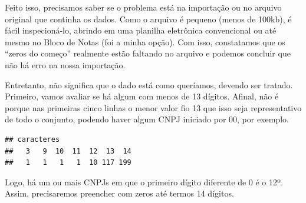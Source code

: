 \documentclass[
]{book}
\newenvironment{Shaded}{\begin{snugshade}}{\end{snugshade}}
\newcommand{\CommentTok}[1]{\textcolor[rgb]{0.56,0.35,0.01}{\textit{#1}}}
\newcommand{\ControlFlowTok}[1]{\textcolor[rgb]{0.13,0.29,0.53}{\textbf{#1}}}
\newcommand{\DataTypeTok}[1]{\textcolor[rgb]{0.13,0.29,0.53}{#1}}
\newcommand{\DecValTok}[1]{\textcolor[rgb]{0.00,0.00,0.81}{#1}}
\newcommand{\KeywordTok}[1]{\textcolor[rgb]{0.13,0.29,0.53}{\textbf{#1}}}
\newcommand{\NormalTok}[1]{#1}
\newcommand{\OperatorTok}[1]{\textcolor[rgb]{0.81,0.36,0.00}{\textbf{#1}}}
\newcommand{\OtherTok}[1]{\textcolor[rgb]{0.56,0.35,0.01}{#1}}
\newcommand{\StringTok}[1]{\textcolor[rgb]{0.31,0.60,0.02}{#1}}
\begin{document}
Feito isso, precisamos saber se o problema está na importação ou no arquivo original que continha os dados. Como o arquivo é pequeno (menos de 100kb), é fácil inspecioná-lo, abrindo em uma planilha eletrônica convencional ou até mesmo no Bloco de Notas (foi a minha opção). Com isso, constatamos que os ``zeros do começo'' realmente estão faltando no arquivo e podemos concluir que não há erro na nossa importação.

Entretanto, não significa que o dado está como queríamos, devendo ser tratado. Primeiro, vamos avaliar se há algum com menos de 13 dígitos. Afinal, não é porque nas primeiras cinco linhas o menor valor fio 13 que isso seja representativo de todo o conjunto, podendo haver algum CNPJ iniciado por 00, por exemplo.

\begin{Shaded}
\end{Shaded}

\begin{verbatim}
## caracteres
##   3   9  10  11  12  13  14 
##   1   1   1   1  10 117 199
\end{verbatim}

Logo, há um ou mais CNPJs em que o primeiro dígito diferente de 0 é o 12º. Assim, precisaremos preencher com zeros até termos 14 dígitos.

\begin{Shaded}
\end{Shaded}
\end{document}
